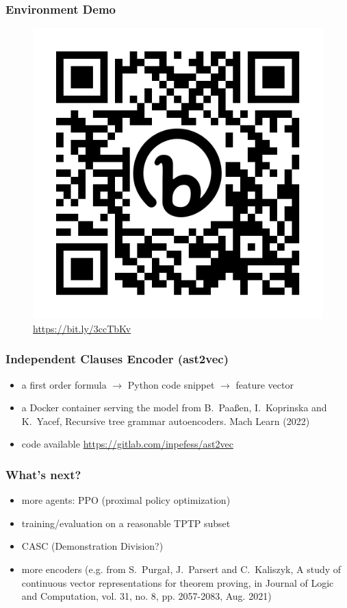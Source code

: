 \documentclass{beamer}
\begin{document}
\begin{frame}[t]
\frametitle{Environment Demo}
\begin{figure}
\caption*{\url{https://bit.ly/3ccTbKv}}
\includegraphics[scale=0.3]{bit.ly_3ccTbKv}
\end{figure}
\end{frame}
\begin{frame}[t]
\frametitle{Independent Clauses Encoder (ast2vec)}
\begin{itemize}
\item a first order formula $\rightarrow$ Python code snippet $\rightarrow$ feature vector
\item a Docker container serving the model from B.~Paaßen, I.~Koprinska and K.~Yacef, Recursive tree grammar autoencoders. Mach Learn (2022)
\item code available \url{https://gitlab.com/inpefess/ast2vec}
\end{itemize}
\end{frame}
\begin{frame}[t]
\frametitle{What's next?}
\begin{itemize}
\item more agents: PPO (proximal policy optimization)
\item training/evaluation on a reasonable TPTP subset
\item CASC (Demonstration Division?)
\item more encoders (e.g. from S.~Purgał, J.~Parsert and C.~Kaliszyk, A study of continuous vector representations for theorem proving, in Journal of Logic and Computation, vol. 31, no. 8, pp. 2057-2083, Aug. 2021)
\end{itemize}
\end{frame}
\end{document}

